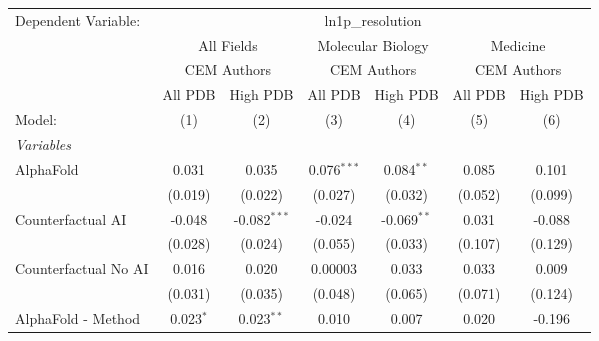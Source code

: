 \begingroup
\centering
\begin{tabular}{lcccccc}
   \tabularnewline \midrule \midrule
   Dependent Variable: & \multicolumn{6}{c}{ln1p\_resolution}\\
 & \multicolumn{2}{c}{All Fields} & \multicolumn{2}{c}{Molecular Biology} & \multicolumn{2}{c}{Medicine} \\
\cmidrule(lr){2-3} \cmidrule(lr){4-5} \cmidrule(lr){6-7}
 & \multicolumn{2}{c}{CEM Authors} & \multicolumn{2}{c}{CEM Authors} & \multicolumn{2}{c}{CEM Authors} \\
\cmidrule(lr){2-3} \cmidrule(lr){4-5} \cmidrule(lr){6-7}
 & \multicolumn{1}{c}{All PDB} & \multicolumn{1}{c}{High PDB} & \multicolumn{1}{c}{All PDB} & \multicolumn{1}{c}{High PDB} & \multicolumn{1}{c}{All PDB} & \multicolumn{1}{c}{High PDB} \\
\cmidrule(lr){2-2} \cmidrule(lr){3-3} \cmidrule(lr){4-4} \cmidrule(lr){5-5} \cmidrule(lr){6-6} \cmidrule(lr){7-7}
   Model:                                                     & (1)           & (2)            & (3)            & (4)            & (5)          & (6)\\  
   \midrule
   \emph{Variables}\\
   AlphaFold                                                  & 0.031         & 0.035          & 0.076$^{***}$  & 0.084$^{**}$   & 0.085        & 0.101\\   
                                                              & (0.019)       & (0.022)        & (0.027)        & (0.032)        & (0.052)      & (0.099)\\   
   Counterfactual AI                                          & -0.048        & -0.082$^{***}$ & -0.024         & -0.069$^{**}$  & 0.031        & -0.088\\   
                                                              & (0.028)       & (0.024)        & (0.055)        & (0.033)        & (0.107)      & (0.129)\\   
   Counterfactual No AI                                       & 0.016         & 0.020          & 0.00003        & 0.033          & 0.033        & 0.009\\   
                                                              & (0.031)       & (0.035)        & (0.048)        & (0.065)        & (0.071)      & (0.124)\\   
   AlphaFold - Method                                         & 0.023$^{*}$   & 0.023$^{**}$   & 0.010          & 0.007          & 0.020        & -0.196\\   

\end{tabular}
